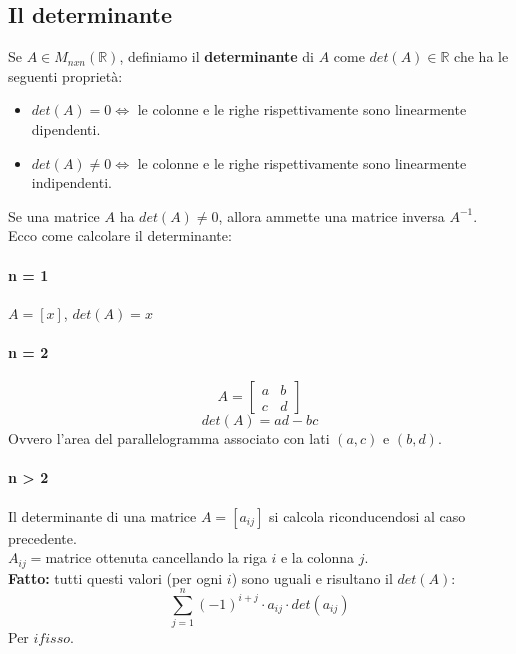\documentclass[12pt,a4paper]{article}
\begin{document}
\subsection{Il determinante}
Se $A \in M_{nxn}(\mathbb{R})$, definiamo il \textbf{determinante} di $A$ come $det(A) \in \mathbb{R}$ che ha le seguenti proprietà:
\begin{itemize}
  \item $det(A) = 0 \Leftrightarrow$ le colonne e le righe rispettivamente sono linearmente dipendenti.
  \item $det(A) \ne 0 \Leftrightarrow$ le colonne e le righe rispettivamente sono linearmente indipendenti.
\end{itemize}
Se una matrice $A$ ha $det(A) \ne 0$, allora ammette una matrice inversa $A^{-1}$.\\
Ecco come calcolare il determinante:
\paragraph{n = 1}
$A = [x]$, $det(A) = x$
\paragraph{n = 2}
\[
A = \begin{bmatrix}
  a & b\\
  c & d
\end{bmatrix}
\]
\[
det(A) = ad - bc
\]
Ovvero l'area del parallelogramma associato con lati $(a,c)$ e $(b,d)$.
\paragraph{n > 2}
Il determinante di una matrice $A = [a_{ij}]$ si calcola riconducendosi al caso precedente.\\
$A_{ij} = $matrice ottenuta cancellando la riga $i$ e la colonna $j$.\\
\textbf{Fatto:} tutti questi valori (per ogni $i$) sono uguali e risultano il $det(A)$:
\[
\sum_{j=1}^{n} (-1)^{i+j} \cdot a_{ij} \cdot det(a_{ij})
\]
Per $i fisso$.
\end{document}
